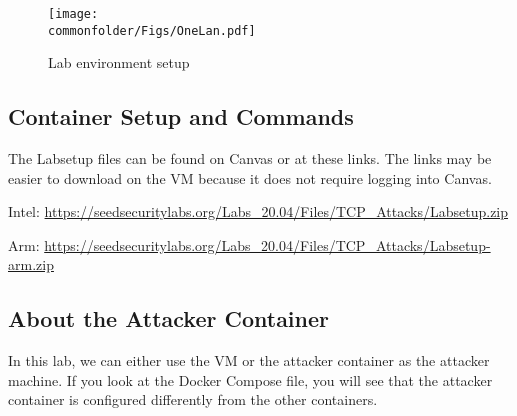 \begin{figure}[htb]
\begin{center}
\texttt{[image: \\commonfolder/Figs/OneLan.pdf]}
\end{center}
\caption{Lab environment setup}
\label{tcp:fig:labsetup}
\end{figure}
 

%
 

\subsection{Container Setup and Commands}

The Labsetup files can be found on Canvas or at these links. 
The links may be easier to download on the VM because it does not require logging into Canvas.

Intel: \url{https://seedsecuritylabs.org/Labs_20.04/Files/TCP_Attacks/Labsetup.zip}

Arm: \url{https://seedsecuritylabs.org/Labs_20.04/Files/TCP_Attacks/Labsetup-arm.zip}





 
\subsection{About the Attacker Container}

In this lab, we can either use the VM or the attacker container
as the attacker machine. If you look at the Docker Compose file, you will
see that the attacker container is configured differently from the other
containers.


